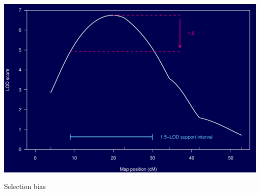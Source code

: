\documentclass[12pt]{article}
\newcommand{\headsize}{\fontsize{35}{35} \selectfont}
\newcommand{\smallsize}{\fontsize{25}{30} \selectfont}
\begin{document}
\vfill

\centerline{\includegraphics{FigsA/lodsuppint.pdf}}










\newpage

\headsize \color{myyellow}
\hfill \begin{minipage}{5.75in}
\centering
Selection bias
\end{minipage}

\vspace{15mm}

\color{mywhite} \smallsize
\end{document}
